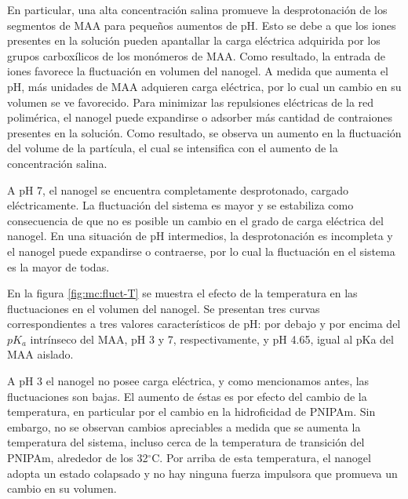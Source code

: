 	En particular, una alta concentraci\'on salina promueve la desprotonaci\'on de los segmentos de MAA para peque\~nos aumentos de pH. Esto se debe a que los iones presentes en la soluci\'on pueden apantallar la carga el\'ectrica adquirida por los grupos carbox\'ilicos de los mon\'omeros de MAA. Como resultado, la entrada de iones favorece la fluctuaci\'on en volumen del nanogel.
	A medida que aumenta el pH, m\'as unidades de MAA adquieren carga el\'ectrica, por lo cual un cambio en su volumen se ve favorecido. Para minimizar las repulsiones el\'ectricas de la red polim\'erica, el nanogel puede expandirse o adsorber m\'as cantidad de contraiones presentes en la soluci\'on. Como resultado, se observa un aumento en la fluctuaci\'on del volume de la part\'icula, el cual se intensifica con el aumento de la concentraci\'on salina.
	
	A pH 7, el nanogel se encuentra completamente desprotonado, cargado el\'ectricamente. La fluctuaci\'on del sistema es mayor y se estabiliza como consecuencia de que no es posible un cambio en el grado de carga el\'ectrica del nanogel. 
	En una situaci\'on de pH intermedios, la desprotonaci\'on es incompleta y el nanogel puede expandirse o contraerse, por lo cual la fluctuaci\'on en el sistema es la mayor de todas.
	
	
	En la figura \ref{fig:mc:fluct-T} se muestra el efecto de la temperatura en las fluctuaciones en el volumen del nanogel. Se presentan tres curvas correspondientes a tres valores caracter\'isticos de pH: por debajo y por encima del $pK_a$ intr\'inseco del MAA, pH 3 y 7, respectivamente, y pH 4.65, igual al pKa del MAA aislado.
	
	A pH 3 el nanogel no posee carga el\'ectrica, y como mencionamos antes, las fluctuaciones son bajas. El aumento de \'estas es por efecto del cambio de la temperatura, en particular por el cambio en la hidroficidad de PNIPAm. Sin embargo, no se observan cambios apreciables a medida que se aumenta la temperatura del sistema, incluso cerca de la temperatura de transici\'on del PNIPAm, alrededor de los 32$^\circ$C. Por arriba de esta temperatura, el nanogel adopta un estado colapsado y no hay ninguna fuerza impulsora que promueva un cambio en su volumen.
	
